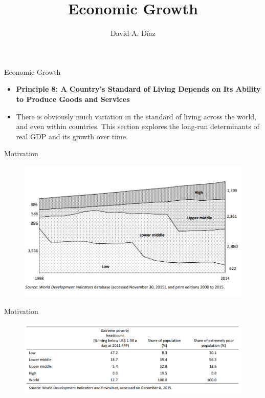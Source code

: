 \documentclass[xcolor={dvipsnames},pdf, hyperref={colorlinks=true, citecolor=ForestGreen, linkcolor=BlueViolet, urlcolor=Magenta}]{beamer}
\title{Economic Growth}
\author{David A. D\'iaz}
\institute{UNC Chapel Hill}
\date{}
\theoremstyle{definition}
\begin{document}
 
	
	\begin{frame}
		
		\titlepage
		
	\end{frame}


\begin{frame}{Economic Growth}
\begin{itemize}
	\item \textbf{Principle 8: A Country's Standard of Living Depends on Its Ability to Produce Goods and Services}
	\item There is obviously much variation in the standard of living across the world, and even within countries. This section explores the long-run determinants of real GDP and its growth over time.
\end{itemize}
\end{frame}

\begin{frame}{Motivation}
\begin{figure}
	\centering
	\includegraphics[scale=.90]{04D_1}
\end{figure}
\end{frame}

\begin{frame}{Motivation}
	\begin{figure}
		\centering
		\includegraphics[scale=.90]{04D_2}
	\end{figure}
\end{frame}
\end{document}
